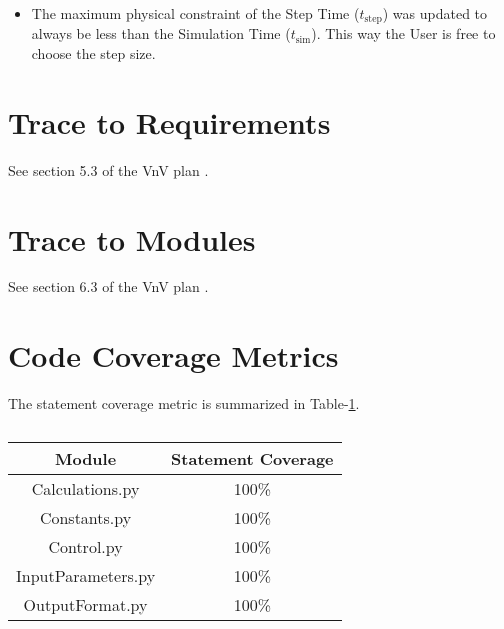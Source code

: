 \documentclass[12pt, titlepage]{article}
\begin{document}
\begin{itemize}

\item The maximum physical constraint of the  Step Time (${t_{\text{step}}}$) was 
updated to always be less than the Simulation Time (${t_{\text{sim}}}$). This way
the User is free to choose the step size.

\end {itemize}
		
\section{Trace to Requirements}

See section 5.3 of the VnV plan \cite{VnVPlan}.
		
\section{Trace to Modules}		

See section 6.3 of the VnV plan \cite{VnVPlan}.

\section{Code Coverage Metrics}

The statement coverage metric is summarized in Table-\ref{tab:statement-coverage}.

\begin{table}[]
\caption{}
\label{tab:statement-coverage}
\begin{tabular}{c|c}
Module             & Statement Coverage \\ \hline
Calculations.py    & 100\%              \\
Constants.py       & 100\%              \\
Control.py         & 100\%              \\
InputParameters.py & 100\%              \\
OutputFormat.py    & 100\%             
\end{tabular}
\end{table}




\end{document}
